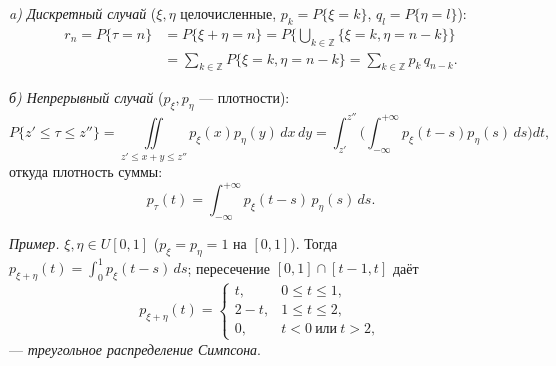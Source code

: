 \textit{a) Дискретный случай} ($\xi,\eta$ целочисленные, $p_k=P\{\xi=k\}$, $q_l=P\{\eta=l\}$):
\begin{align*}
 r_n=P\{\tau=n\}&=P\{\xi+\eta=n\}=P\!\Big\{\textstyle\bigcup_{k\in\mathbb{Z}}\{\xi=k,\eta=n-k\}\Big\}\\
 &=\sum_{k\in\mathbb{Z}}P\{\xi=k,\eta=n-k\}=\sum_{k\in\mathbb{Z}}p_k\,q_{n-k}.
\end{align*}

\textit{б) Непрерывный случай} ($p_\xi,p_\eta$ — плотности):
\[ P\{z'\le\tau\le z''\}=\iint\limits_{z'\le x+y\le z''}p_\xi(x)p_\eta(y)\,dx\,dy=\int_{z'}^{z''}\!\Big(\int_{-\infty}^{+\infty}p_\xi(t-s)p_\eta(s)\,ds\Big)dt, \]
откуда плотность суммы:
\[ p_\tau(t)=\int_{-\infty}^{+\infty}p_\xi(t-s)\,p_\eta(s)\,ds. \]

\textit{Пример.} $\xi,\eta\in U[0,1]$ ($p_\xi=p_\eta=1$ на $[0,1]$). Тогда $p_{\xi+\eta}(t)=\int_0^1 p_\xi(t-s)\,ds$; пересечение $[0,1]\cap[t-1,t]$ даёт
\[ p_{\xi+\eta}(t)=\begin{cases} t, & 0\le t\le1,\\ 2-t, & 1\le t\le2,\\ 0, & t<0\ \text{или}\ t>2,\end{cases} \]
— \textit{треугольное распределение Симпсона}.
